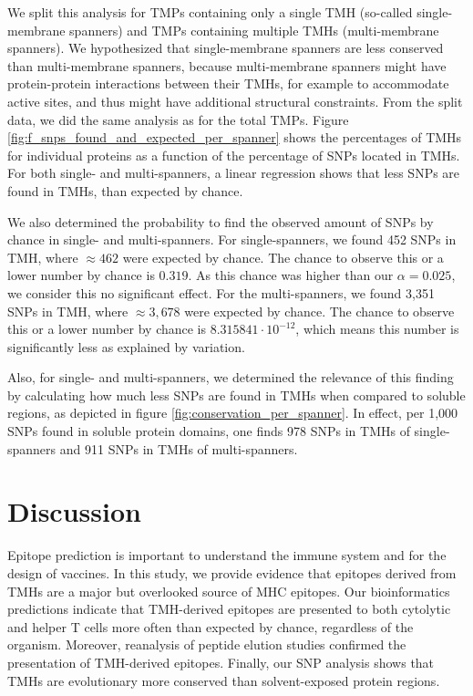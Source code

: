 We split this analysis for TMPs containing only a single TMH (so-called single-membrane spanners) and TMPs containing multiple TMHs (multi-membrane spanners). 
We hypothesized that single-membrane spanners are less conserved than multi-membrane spanners,
because multi-membrane spanners
might have protein-protein interactions between their TMHs, 
for example to accommodate active sites, and 
thus might have additional structural constraints.
From the split data, we did the same analysis as for the total TMPs.
Figure \ref{fig:f_snps_found_and_expected_per_spanner} 
shows the percentages of TMHs for individual proteins as a function of the
percentage of SNPs located in TMHs.
For both single- and multi-spanners, a linear regression shows that less
SNPs are found in TMHs, than expected by chance.

We also determined the probability to find the 
observed amount of SNPs  by chance in single- and multi-spanners.
For single-spanners, we found 452 SNPs in TMH, where
$\approx462$ were expected by chance. 
The chance to observe this or a lower number by chance is 
$0.319$. As this chance was higher than our $\alpha = 0.025$,
we consider this no significant effect.
For the multi-spanners, we found 3,351 SNPs in TMH, where 
$\approx3,678$ were expected by chance. 
The chance to observe this or a lower number by chance is 
$8.315841 \cdot 10^{-12}$, 
which means this number is significantly less as explained by variation. 

Also, for single- and multi-spanners, 
we determined the relevance of this finding by
calculating how much less SNPs are found in TMHs
when compared to soluble regions,
as depicted in figure \ref{fig:conservation_per_spanner}.
In effect, per 1,000 SNPs found in soluble protein domains, 
one finds 978 SNPs in TMHs 
of single-spanners
and 911 SNPs in TMHs of multi-spanners.

\section{Discussion}


Epitope prediction is important to understand the immune system 
and for the design of vaccines.
In this study, we provide evidence that epitopes
derived from TMHs are a major but overlooked source of MHC epitopes. 
Our bioinformatics predictions indicate that TMH-derived epitopes 
are presented to both cytolytic and helper T cells more often than expected by chance, 
regardless of the organism. 
Moreover, reanalysis of peptide elution studies confirmed the presentation of TMH-derived epitopes.
Finally, our SNP analysis shows that TMHs are evolutionary more conserved 
than solvent-exposed protein regions.


